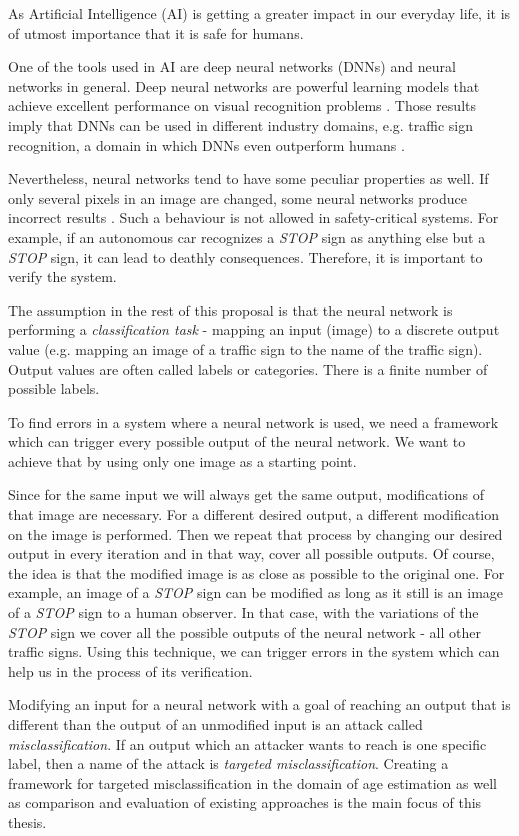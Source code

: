 As Artificial Intelligence (AI) is getting a greater impact in our everyday life, it is of utmost importance that it is safe for humans.  

One of the tools used in AI are deep neural networks (DNNs) and neural networks in general. Deep neural networks are powerful learning models that achieve excellent performance on visual recognition problems \cite{krizhevsky2012imagenet}. Those results imply that DNNs can be used in different industry domains, e.g. traffic sign recognition, a domain in which DNNs even outperform humans \cite{outperformhumans}. 

Nevertheless, neural networks tend to have some peculiar properties as well. If only several pixels in an image are changed, some neural networks produce incorrect results \cite{szegedy2013intriguing}. Such a behaviour is not allowed in safety-critical systems. For example, if an autonomous car recognizes a  \textit{STOP} sign as anything else but a \textit{STOP} sign, it can lead to deathly consequences. Therefore, it is important to verify the system. 

The assumption in the rest of this proposal is that the neural network is performing a \textit{classification task} - mapping an input (image) to a discrete output value (e.g. mapping an image of a traffic sign to the name of the traffic sign).  Output values are often called labels or categories. There is a finite number of possible labels.

To find errors in a system where a neural network is used, we need a framework which can trigger every possible output of the neural network.  We want to achieve that by using only one image as a starting point. 

Since for the same input we will always get the same output, modifications of that image are necessary. For a different desired output, a different modification on the image is performed.
Then we repeat that process by changing our desired output in every iteration and in that way, cover all possible outputs. Of course, the idea is that the modified image is as close as possible to the original one. For example, an image of a  \textit{STOP} sign can be modified as long as it still is an image of a  \textit{STOP} sign to a human observer. In that case, with the variations of the \textit{STOP} sign we cover all the possible outputs of the neural network - all other traffic signs. Using this technique, we can trigger errors in the system which can help us in the process of its verification. 

Modifying an input for a neural network with a goal of reaching an output that is different than the output of an unmodified input is an attack called \textit{misclassification}. If an output which an attacker wants to reach is one specific label, then a name of the attack is \textit{targeted misclassification}. Creating a framework for targeted misclassification in the domain of age estimation as well as comparison and evaluation of existing approaches is the main focus of this thesis.
